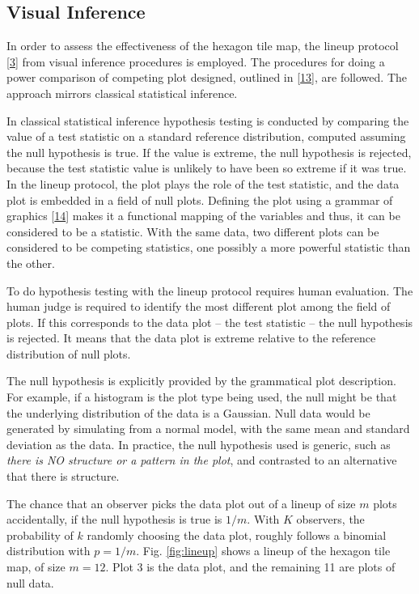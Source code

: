 \documentclass[conference,final,]{IEEEtran}
\begin{document}
\hypertarget{visual-inference}{%
\subsection{Visual Inference}\label{visual-inference}}

In order to assess the effectiveness of the hexagon tile map, the lineup protocol {[}\protect\hyperlink{ref-GIIV}{3}{]} from visual inference procedures is employed. The procedures for doing a power comparison of competing plot designed, outlined in {[}\protect\hyperlink{ref-GTPCCD}{13}{]}, are followed. The approach mirrors classical statistical inference.

In classical statistical inference hypothesis testing is conducted by comparing the value of a test statistic on a standard reference distribution, computed assuming the null hypothesis is true. If the value is extreme, the null hypothesis is rejected, because the test statistic value is unlikely to have been so extreme if it was true. In the lineup protocol, the plot plays the role of the test statistic, and the data plot is embedded in a field of null plots. Defining the plot using a grammar of graphics {[}\protect\hyperlink{ref-ggplot2}{14}{]} makes it a functional mapping of the variables and thus, it can be considered to be a statistic. With the same data, two different plots can be considered to be competing statistics, one possibly a more powerful statistic than the other.

To do hypothesis testing with the lineup protocol requires human evaluation. The human judge is required to identify the most different plot among the field of plots. If this corresponds to the data plot -- the test statistic -- the null hypothesis is rejected. It means that the data plot is extreme relative to the reference distribution of null plots.

The null hypothesis is explicitly provided by the grammatical plot description. For example, if a histogram is the plot type being used, the null might be that the underlying distribution of the data is a Gaussian. Null data would be generated by simulating from a normal model, with the same mean and standard deviation as the data. In practice, the null hypothesis used is generic, such as \emph{there is NO structure or a pattern in the plot}, and contrasted to an alternative that there is structure.

The chance that an observer picks the data plot out of a lineup of size \(m\) plots accidentally, if the null hypothesis is true is \(1/m\). With \(K\) observers, the probability of \(k\) randomly choosing the data plot, roughly follows a binomial distribution with \(p=1/m\). Fig. \ref{fig:lineup} shows a lineup of the hexagon tile map, of size \(m=12\). Plot 3 is the data plot, and the remaining 11 are plots of null data.
\end{document}
